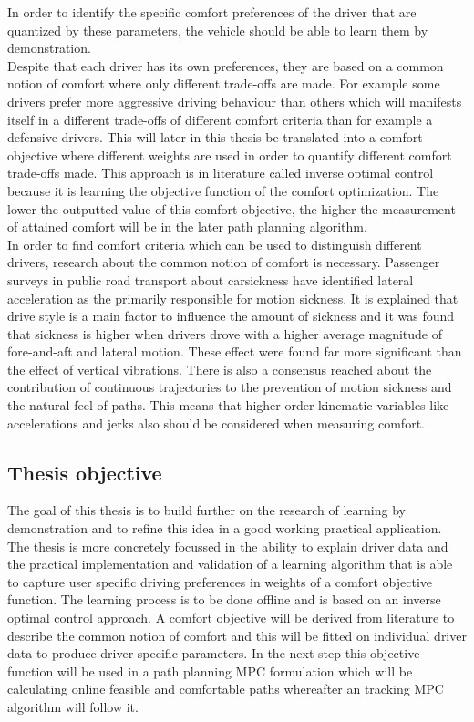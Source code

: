 In order to identify the specific comfort preferences of the driver that are quantized by these parameters, the vehicle should be able to learn them by demonstration. \cite{Kuderer2015a}\\
Despite that each driver has its own preferences, they are based on a common notion of comfort where only different trade-offs are made. For example some drivers prefer more aggressive driving behaviour than others which will manifests itself in a different trade-offs of different comfort criteria than for example a defensive drivers. This will later in this thesis be translated into a comfort objective where different weights are used in order to quantify different comfort trade-offs made. This approach is in literature called inverse optimal control because it is learning the objective function of the comfort optimization. The lower the outputted value of this comfort objective, the higher the measurement of attained comfort will be in the later path planning algorithm.\\

In order to find comfort criteria which can be used to distinguish different drivers, research about the common notion of comfort is necessary. Passenger surveys in public road transport about carsickness \cite{Turner1999} have identified lateral acceleration as the primarily responsible for motion sickness. It is explained that drive style is a main factor to influence the amount of sickness and it was found that sickness is higher when drivers drove with a higher average magnitude of fore-and-aft and lateral motion. These effect were found far more significant than the effect of vertical vibrations. There is also a consensus reached about the contribution of continuous trajectories to the prevention of motion sickness and the natural feel of paths.\cite{Elbanhawi2015} This means that higher order kinematic variables like accelerations and jerks also should be considered when measuring comfort.\\

\subsection{Thesis objective}
The goal of this thesis is to build further on the research of learning by demonstration \cite{Kuderer2015a} and to refine this idea in a good working practical application. The thesis is more concretely focussed in the ability to explain driver data and the practical implementation and validation of a learning algorithm that is able to capture user specific driving preferences in weights of a comfort objective function. The learning process is to be done offline and is based on an inverse optimal control approach. A comfort objective will be derived from literature to describe the common notion of comfort and this will be fitted on individual driver data to produce driver specific parameters. In the next step this objective function will be used in a path planning MPC formulation which will be calculating online feasible and comfortable paths whereafter an tracking MPC algorithm will follow it. \\

